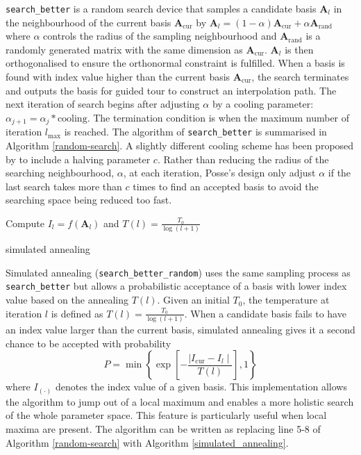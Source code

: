 \documentclass[12pt]{article}
\begin{document}
\texttt{search\_better} is a random search device that samples a candidate basis \(\mathbf{A}_{l}\) in the neighbourhood of the current basis \(\mathbf{A}_{\text{cur}}\) by \(\mathbf{A}_{l} = (1- \alpha)\mathbf{A}_{\text{cur}} + \alpha \mathbf{A}_{\text{rand}}\) where \(\alpha\) controls the radius of the sampling neighbourhood and \(\mathbf{A}_{\text{rand}}\) is a randomly generated matrix with the same dimension as \(\mathbf{A}_{\text{cur}}\). \(\mathbf{A}_{l}\) is then orthogonalised to ensure the orthonormal constraint is fulfilled. When a basis is found with index value higher than the current basis \(\mathbf{A}_{\text{cur}}\), the search terminates and outputs the basis for guided tour to construct an interpolation path. The next iteration of search begins after adjusting \(\alpha\) by a cooling parameter: \(\alpha_{j+1} = \alpha_j * \text{cooling}\). The termination condition is when the maximum number of iteration \(l_{\max}\) is reached. The algorithm of \texttt{search\_better} is summarised in Algorithm \ref{random-search}. A slightly different cooling scheme has been proposed by \citet{posse1995projection} to include a halving parameter \(c\). Rather than reducing the radius of the searching neighbourhood, \(\alpha\), at each iteration, Posse's design only adjust \(\alpha\) if the last search takes more than \(c\) times to find an accepted basis to avoid the searching space being reduced too fast.

\begin{algorithm}
\SetAlgoLined
    Compute $I_{l} = f(\mathbf{A}_{l})$ and $T(l) = \frac{T_0}{\log(l + 1)}$\;
  \caption{simulated annealing}
  \label{simulated_annealing}
\end{algorithm}

Simulated annealing (\texttt{search\_better\_random}) \citep[\citet{bertsimas1993simulated}]{kirkpatrick1983optimization} uses the same sampling process as \texttt{search\_better} but allows a probabilistic acceptance of a basis with lower index value based on the annealing \(T(l)\). Given an initial \(T_0\), the temperature at iteration \(l\) is defined as \(T(l) = \frac{T_0}{\log(l + 1)}\). When a candidate basis fails to have an index value larger than the current basis, simulated annealing gives it a second chance to be accepted with probability \[P= \min\left\{\exp\left[-\frac{\mid I_{\text{cur}} - I_{l} \mid}{T(l)}\right],1\right\}\] where \(I_{(\cdot)}\) denotes the index value of a given basis. This implementation allows the algorithm to jump out of a local maximum and enables a more holistic search of the whole parameter space. This feature is particularly useful when local maxima are present. The algorithm can be written as replacing line 5-8 of Algorithm \ref{random-search} with Algorithm \ref{simulated_annealing}.
\end{document}
